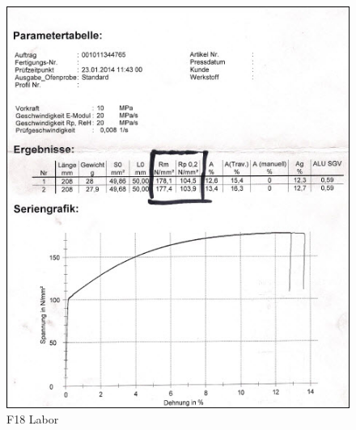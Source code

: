 \documentclass[12pt,a4paper,parskip]{scrartcl}
\begin{document}
\begin{figure}[hbtp]
\centering
\includegraphics[width=1\textwidth]{F18Labor.jpg}
\caption{F18 Labor}
\end{figure}
\end{document}
